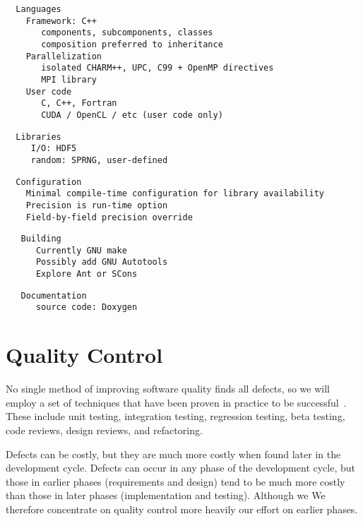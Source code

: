 \documentclass[10pt]{article}
\begin{document}
\begin{verbatim}
  Languages
    Framework: C++
       components, subcomponents, classes
       composition preferred to inheritance
    Parallelization
       isolated CHARM++, UPC, C99 + OpenMP directives
       MPI library
    User code
       C, C++, Fortran 
       CUDA / OpenCL / etc (user code only)
\end{verbatim}

\begin{verbatim}
  Libraries
     I/O: HDF5
     random: SPRNG, user-defined
\end{verbatim}

\begin{verbatim}
  Configuration
    Minimal compile-time configuration for library availability
    Precision is run-time option
    Field-by-field precision override
\end{verbatim}

\begin{verbatim}
   Building
      Currently GNU make
      Possibly add GNU Autotools
      Explore Ant or SCons
\end{verbatim}


\begin{verbatim}
   Documentation
      source code: Doxygen
\end{verbatim}



\section{Quality Control} \label{s:testing}

No single method of improving software quality finds all defects, so
we will employ a set of techniques that have been proven in practice
to be successful~\cite{Mc04}.  These include unit testing, integration
testing, regression testing, beta testing, code reviews, design reviews, and
refactoring.

Defects can be costly, but they are much more costly when found later
in the development cycle.  Defects can occur in any phase of the
development cycle, but those in earlier phases (requirements and
design) tend to be much more costly than those in later phases
(implementation and testing).  Although we We therefore concentrate on quality
control more heavily our effort on earlier phases.
\end{document}
